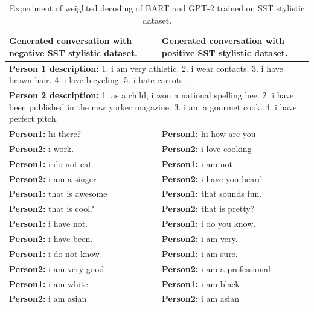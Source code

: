 \begin{table}[ht]
\centering
 \begin{tabular}{|p{7cm}|p{7cm}|} 
 \hline
 \textbf{Generated conversation with negative SST stylistic dataset.} & \textbf{Generated conversation with positive SST stylistic dataset.}\\
 \hline
 \multicolumn{2}{|p{14cm}|}{\textbf{Person 1 description:} 1. i am very athletic. 2. i wear contacts. 3. i have brown hair. 4. i love bicycling. 5. i hate carrots.} \\
 \hline
 \multicolumn{2}{|p{14cm}|}{\textbf{Person 2 description:} 1. as a child, i won a national spelling bee. 2. i have been published in the new yorker magazine. 3. i am a gourmet cook. 4. i have perfect pitch.} \\
 \hline
 \textbf{Person1:} hi there? & \textbf{Person1:} hi how are you \\
 \textbf{Person2:} i work. &  \textbf{Person2:} i love cooking \\ 
 \textbf{Person1:} i do not eat & \textbf{Person1:} i am not \\
 \textbf{Person2:} i am a singer & \textbf{Person2:} i have you heard \\
 \textbf{Person1:} that is awesome & \textbf{Person1:} that sounds fun. \\
 \textbf{Person2:} that is cool? & \textbf{Person2:} that is pretty?  \\
 \textbf{Person1:} i have not. & \textbf{Person1:} i do you know. \\
 \textbf{Person2:} i have been. & \textbf{Person2:} i am very. \\
 \textbf{Person1:} i do not know & \textbf{Person1:} i am sure. \\
 \textbf{Person2:} i am very good & \textbf{Person2:} i am a professional \\
 \textbf{Person1:} i am white & \textbf{Person1:} i am black \\
 \textbf{Person2:} i am asian & \textbf{Person2:} i am asian \\
 \hline
 \end{tabular}
 \caption{Experiment of weighted decoding of BART and GPT-2 trained on SST stylistic dataset.}
\label{tab:sst_wd}
\end{table}


